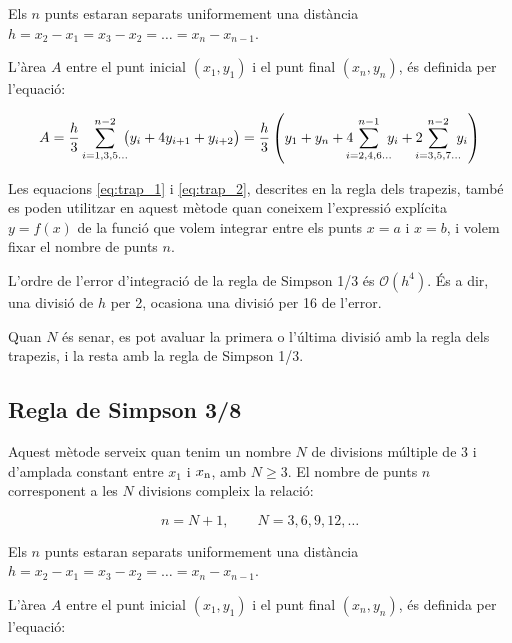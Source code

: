 Els $n$ punts estaran separats uniformement una distància $h = x_2-x_1 = x_3-x_2 = \dots = x_n-x_{n-1}$.

L'àrea $A$ entre el punt inicial $(x_1, y_1)$ i el punt final $(x_n, y_n)$, és definida per l'equació:

 \begin{equation}\label{eq:simp_1_3}
   A =  \frac{h}{3} \sum_{i=1,3,5\dots}^{n-2} \hspace{-0.5em} \big( y_i + 4 y_{i+1} + y_{i+2} \big) =
   \frac{h}{3} \left( y_1 + y_n + 4 \hspace{-0.7em} \sum_{i=2,4,6\dots}^{n-1} \hspace{-0.5em} y_i +
   2 \hspace{-0.7em} \sum_{i=3,5,7\dots}^{n-2} \hspace{-0.5em} y_i \right)
 \end{equation}

Les equacions \eqref{eq:trap_1} i \eqref{eq:trap_2}, descrites en la regla dels trapezis, també es poden utilitzar en aquest mètode quan  coneixem l'expressió explícita $y=f(x)$ de la funció que volem integrar entre els punts $x=a$ i $x=b$, i volem fixar el nombre de punts $n$.

L'ordre de l'error d'integració de la regla de Simpson 1/3 és $\mathscr{O}(h^4)$. És a dir, una divisió de $h$ per 2, ocasiona una divisió per 16 de l'error.

Quan $N$ és senar, es pot avaluar la primera o l'última divisió amb la  regla dels trapezis, i la resta amb la regla de Simpson 1/3.

 \subsection{Regla de Simpson 3/8}

Aquest mètode serveix quan tenim un nombre  $N$ de divisions múltiple de 3 i d'amplada constant entre $x_1$ i $x_\mathrm{n}$, amb $N \geq 3$.  El nombre de punts $n$ corresponent a les $N$ divisions  compleix la relació:

\begin{equation}
	n = N+1,\qquad N = 3, 6, 9, 12, \dots
\end{equation}
 
Els $n$ punts estaran separats uniformement una distància $h = x_2-x_1 = x_3-x_2 = \dots = x_n-x_{n-1}$.

L'àrea $A$ entre el punt inicial $(x_1, y_1)$ i el punt final $(x_n, y_n)$, és definida per l'equació:

